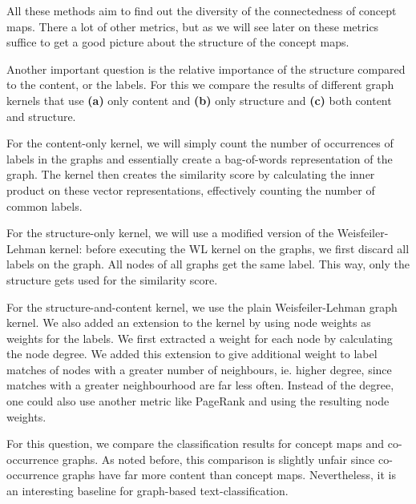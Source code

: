 All these methods aim to find out the diversity of the connectedness of concept maps. There a lot of other metrics, but as we will see later on these metrics suffice to get a good picture about the structure of the concept maps.

Another important question is the relative importance of the structure compared to the content, or the labels.
For this we compare the results of different graph kernels that use \textbf{(a)} only content and \textbf{(b)} only structure and \textbf{(c)} both content and structure.

For the content-only kernel, we will simply count the number of occurrences of labels in the graphs and essentially create a bag-of-words representation of the graph. The kernel then creates the similarity score by calculating the inner product on these vector representations, effectively counting the number of common labels.

For the structure-only kernel, we will use a modified version of the Weisfeiler-Lehman kernel: before executing the WL kernel on the graphs, we first discard all labels on the graph. All nodes of all graphs get the same label. This way, only the structure gets used for the similarity score.

For the structure-and-content kernel, we use the plain Weisfeiler-Lehman graph kernel. We also added an extension to the kernel by using node weights as weights for the labels. We first extracted a weight for each node by calculating the node degree.
We added this extension to give additional weight to label matches of nodes with a greater number of neighbours, ie. higher degree, since matches with a greater neighbourhood are far less often.
Instead of the degree, one could also use another metric like PageRank and using the resulting node weights.


For this question, we compare the classification results for concept maps and co-occurrence graphs. As noted before, this comparison is slightly unfair since co-occurrence graphs have far more content than concept maps.
Nevertheless, it is an interesting baseline for graph-based text-classification.

